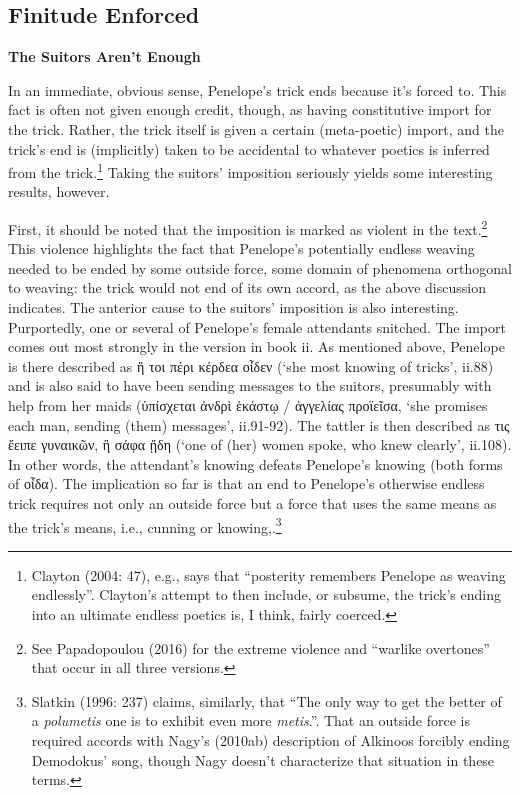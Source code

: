 \documentclass[12pt]{article}
\begin{document}
\subsection{ Finitude Enforced}

\noindent \textbf{The Suitors Aren't Enough}

In an immediate, obvious sense, Penelope's trick ends because it's forced to. This fact is often not given enough credit, though, as having constitutive import for the trick. Rather, the trick itself is given a certain (meta-poetic) import, and the trick's end is (implicitly) taken to be accidental to whatever poetics is inferred from the trick.\footnote{ Clayton (2004: 47), e.g., says that ``posterity remembers Penelope as weaving endlessly''. Clayton's attempt to then include, or subsume, the trick's ending into an ultimate endless poetics is, I think, fairly coerced.} Taking the suitors' imposition seriously yields some interesting results, however.

First, it should be noted that the imposition is marked as violent in the text.\footnote{ See Papadopoulou (2016) for the extreme violence and ``warlike overtones'' that occur in all three versions.} This violence highlights the fact that Penelope's potentially endless weaving needed to be ended by some outside force, some domain of phenomena orthogonal to weaving: the trick would not end of its own accord, as the above discussion indicates. The anterior cause to the suitors' imposition is also interesting. Purportedly, one or several of Penelope's female attendants snitched. The import comes out most strongly in the version in book ii. As mentioned above, Penelope is there described as ἥ τοι πέρι κέρδεα οἶδεν (`she most knowing of tricks', ii.88) and is also said to have been sending messages to the suitors, presumably with help from her maids (ὑπίσχεται ἀνδρὶ ἑκάστῳ / ἀγγελίας προϊεῖσα, `she promises each man, sending (them) messages', ii.91-92). The tattler is then described as τις ἔειπε γυναικῶν, ἣ σάφα ᾔδη (`one of (her) women spoke, who knew clearly', ii.108). In other words, the attendant's knowing defeats Penelope's knowing (both forms of οἶδα). The implication so far is that an end to Penelope's otherwise endless trick requires not only an outside force but a force that uses the same means as the trick's means, i.e., cunning or knowing,.\footnote{ Slatkin (1996: 237) claims, similarly, that ``The only way to get the better of a \textit{polumetis} one is to exhibit even more \textit{metis}.''. That an outside force is required accords with Nagy's (2010ab) description of Alkinoos forcibly ending Demodokus' song, though Nagy doesn't characterize that situation in these terms.}
\end{document}
